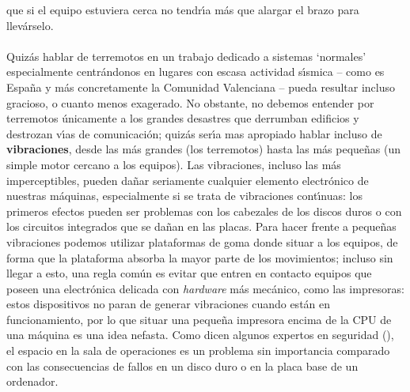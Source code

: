 que si el equipo estuviera cerca no tendr\'{\i}a m\'as que alargar el brazo para
llev\'arselo.\\
\\Quiz\'as hablar de terremotos en un trabajo dedicado a sistemas `normales'
especialmente cen\-tr\'an\-do\-nos en lugares con escasa actividad s\'{\i}smica
-- 
como es Espa\~na y m\'as concretamente la Comunidad Valenciana -- pueda resultar
incluso gracioso, o cuanto menos exagerado. No obstante, no debemos entender
por terremotos \'unicamente a los grandes desastres que derrumban edificios y
destrozan v\'{\i}as de comunicaci\'on; quiz\'as ser\'{\i}a mas apropiado hablar
incluso de {\bf vibraciones}, desde las m\'as grandes (los terremotos) hasta 
las m\'as peque\~nas (un simple motor cercano a los equipos). Las vibraciones,
incluso las m\'as imperceptibles, pueden da\~nar seriamente cualquier elemento
electr\'onico de nuestras m\'aquinas, especialmente si se trata de vibraciones
cont\'{\i}nuas: los primeros efectos pueden ser problemas con los cabezales de
los discos duros o con los circuitos integrados que se da\~nan en las placas.
Para hacer frente a peque\~nas vibraciones podemos utilizar plataformas de goma
donde situar a los equipos, de forma que la plataforma absorba la mayor parte
de los movimientos; incluso sin llegar a esto, una regla com\'un es evitar 
que entren en contacto equipos que poseen una electr\'onica delicada con {\it
hardware} m\'as mec\'anico, como las impresoras: estos dispositivos no paran de
generar vibraciones cuando est\'an en funcionamiento, por lo que situar una
peque\~na impresora encima de la CPU de una m\'aquina es una idea nefasta. Como
dicen algunos expertos en seguridad (\cite{kn:spa96}), el espacio en la sala de 
operaciones es un problema sin importancia comparado con las consecuencias de
fallos en un disco duro o en la placa base de un ordenador.
